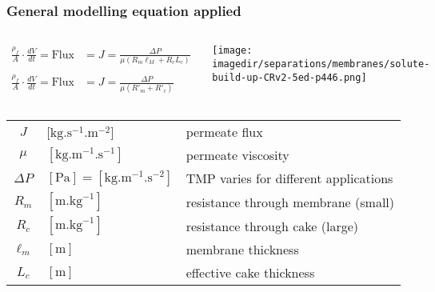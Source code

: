 \begin{frame}\frametitle{General modelling equation applied}
	
	\begin{columns}[c]
			\[
				\begin{array}{rl}
					\displaystyle\frac{\rho_f}{A}\cdot\frac{dV}{dt} = \text{Flux} &= J = \displaystyle \frac{\Delta P}{\mu \left(R_m \ell_M + R_c L_c \right)} \\
					\\					
					\displaystyle\frac{\rho_f}{A}\cdot\frac{dV}{dt} = \text{Flux} &= J = \displaystyle \frac{\Delta P}{\mu \left(R'_m + R'_c \right)} 
				\end{array}
			\]
			\begin{center}
				\texttt{[image: \\imagedir/separations/membranes/solute-build-up-CRv2-5ed-p446.png]}
			\end{center}
	\end{columns}
	\vspace{-24pt}
	\begin{tabular}{cll}
		$J$			&	[$\text{kg}.\text{s}^{-1}\text{.m}^{-2}$] 				& permeate flux \\
		$\mu$ 		&  	$[\text{kg}.\text{m}^{-1}\text{.s}^{-1}]$				& permeate viscosity\\
		$\Delta P$	&	$[\text{Pa}] = [\text{kg}.\text{m}^{-1}\text{.s}^{-2}]$ & TMP varies for different applications\\		
		$R_m$ 		&  	$[\text{m}.\text{kg}^{-1}]$								& resistance through membrane (small)\\
		$R_c$ 		&  	$[\text{m}.\text{kg}^{-1}]$								& resistance through cake (large)\\
		$\ell_m$ 	&   $[\text{m}]$											& membrane thickness\\
		$L_c$ 		&   $[\text{m}]$											& effective cake thickness
	\end{tabular}
	\vspace{6pt}
\end{frame}

